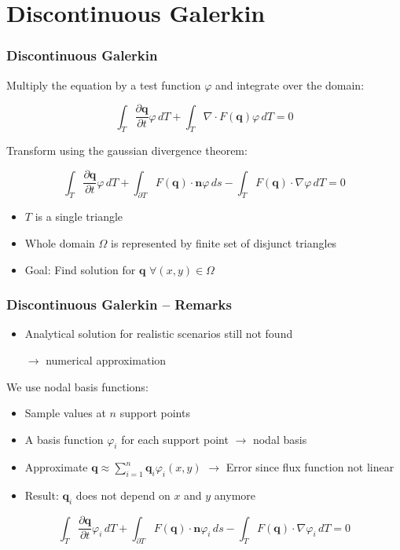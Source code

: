 \documentclass{beamer}
\newcommand{\todo}[1]{
  \textcolor{red}{TODO: #1}
  \note{\textcolor{red}{TODO: #1}}
}
\renewcommand{\todo}[1]{}
\newcommand{\pd}[2]{\dfrac{\partial #1}{\partial #2}}
\renewcommand{\phi}{\varphi}
\begin{document}
\section{Discontinuous Galerkin}
\label{sec:basis-functions-intro}

\begin{frame}
  \frametitle{Discontinuous Galerkin}
  Multiply the equation by a test function $\phi$ and integrate over the domain:
  
  \begin{equation}
    \label{eq:shallow-water-weak-form}
    \int_T \pd {\mathbf{q}}{t} \phi \, dT + \int_T \nabla \cdot F(\mathbf{q}) \phi \, dT = 0
  \end{equation}

  Transform using the gaussian divergence theorem:

  \begin{equation}
    \label{eq:shallow-water-dg}
    \int_T \pd {\mathbf{q}}{t} \phi \, dT +
    \int_{\partial T} F(\mathbf{q}) \cdot \mathbf{n} \phi \, ds -
    \int_T F(\mathbf{q}) \cdot \nabla \phi \, dT = 0
  \end{equation}
  
  \begin{itemize}
  \item $T$ is a single triangle
  \item Whole domain $\Omega$ is represented by finite set of disjunct triangles
  \item Goal: Find solution for $\mathbf{q}$ $\forall \left(x,y\right) \in \Omega$
  \end{itemize}

\end{frame}

\begin{frame}
  \frametitle{Discontinuous Galerkin -- Remarks}
  \begin{itemize}
  \item Analytical solution for realistic scenarios still not found

  $\rightarrow$ numerical approximation
  \end{itemize}
  We use nodal basis functions:
  \begin{itemize}  
  \item Sample values at $n$ support points
  \item A basis function $\phi_i$ for each support point $\rightarrow$ nodal basis
  \item Approximate 
    $\mathbf{q} \approx \sum_{i=1}^n \mathbf{q}_i \phi_i(x,y)$ $\rightarrow$ Error since flux function not linear \todo{Correct?}
  \item Result: $\mathbf{q}_i$ does not depend on $x$ and $y$ anymore
  \end{itemize}

  \begin{equation}
    \label{eq:shallow-water-phi-i}
    \int_T \pd {\mathbf{q}}{t} \phi_i \, dT +
    \int_{\partial T} F(\mathbf{q}) \cdot \mathbf{n} \phi_i \, ds -
    \int_T F(\mathbf{q}) \cdot \nabla \phi_i \, dT = 0
  \end{equation}
\end{frame}
\end{document}
